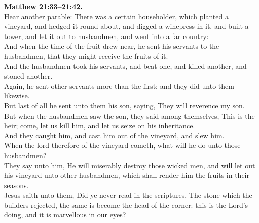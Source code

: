 \documentclass[10pt]{article} %
\begin{document}
{\begin{minipage}[t]{0.45\textwidth}
\textbf{Matthew 21:33--21:42.}\\
Hear another parable: There was a certain householder, which planted a vineyard, and hedged it round about, and digged a winepress in it, and built a tower, and let it out to husbandmen, and went into a far country:\\
And when the time of the fruit drew near, he sent his servants to the husbandmen, that they might receive the fruits of it.\\
And the husbandmen took his servants, and beat one, and killed another, and stoned another.\\
Again, he sent other servants more than the first: and they did unto them likewise.\\
But last of all he sent unto them his son, saying, They will reverence my son.\\
But when the husbandmen saw the son, they said among themselves, This is the heir; come, let us kill him, and let us seize on his inheritance.\\
And they caught him, and cast him out of the vineyard, and slew him.\\
When the lord therefore of the vineyard cometh, what will he do unto those husbandmen?\\
They say unto him, He will miserably destroy those wicked men, and will let out his vineyard unto other husbandmen, which shall render him the fruits in their seasons.\\
Jesus saith unto them, Did ye never read in the scriptures, The stone which the builders rejected, the same is become the head of the corner: this is the Lord's doing, and it is marvellous in our eyes?
\end{minipage}}
\vspace*{\fill}
\newpage
\Huge%
\vspace*{\fill}
\end{document}
